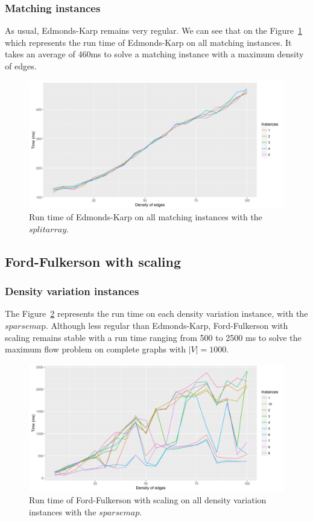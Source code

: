 \subsubsection{Matching instances}
As usual, Edmonds-Karp remains very regular. We can see that on the Figure~\ref{fig:ekmatching} which represents the run time of Edmonds-Karp on all matching instances. It takes an average of 460ms to solve a matching instance with a maximum density of edges.
\begin{figure}[H]
\begin{center}
\includegraphics[scale=0.5]{images/results/ekmatching.png}
\caption{Run time of Edmonds-Karp on all matching instances with the $split array$.}
\label{fig:ekmatching}
\end{center}
\end{figure}
\subsection{Ford-Fulkerson with scaling}
\subsubsection{Density variation instances}
The Figure~\ref{fig:FFmean} represents the run time on each density variation instance, with the $sparsema$p. Although less regular than Edmonds-Karp, Ford-Fulkerson with scaling remains stable with a run time ranging from 500 to 2500 ms to solve the maximum flow problem on complete graphs with $|V|=1000$.
\begin{figure}[H]
\begin{center}
\includegraphics[scale=0.5]{images/results/FFmean.png}
\caption{Run time of Ford-Fulkerson with scaling on all density variation instances with the $sparse map$.}
\label{fig:FFmean}
\end{center}
\end{figure}

